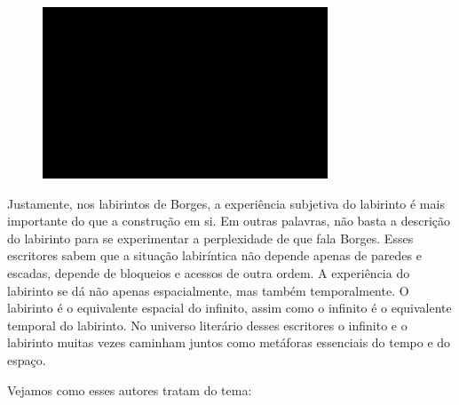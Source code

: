 \begin{figure}[!ht]

\centering
 \includegraphics[width=85mm]{./imgs/im1.jpg}
\caption{\tiny{}}

\end{figure}

Justamente, nos labirintos de Borges, a experiência subjetiva do
labirinto é mais importante do que a construção em si. Em outras palavras,
não basta a descrição do labirinto para se experimentar a perplexidade
de que fala Borges. Esses escritores sabem que a situação labiríntica
não depende apenas de paredes e escadas, depende de bloqueios e acessos
de outra ordem. A experiência do labirinto se dá não apenas
espacialmente, mas também temporalmente. O labirinto é o equivalente
espacial do infinito, assim como o infinito é o equivalente temporal do
labirinto. No universo literário desses escritores o infinito e o
labirinto muitas vezes caminham juntos como metáforas essenciais do
tempo e do espaço.

Vejamos como esses autores tratam do tema:

